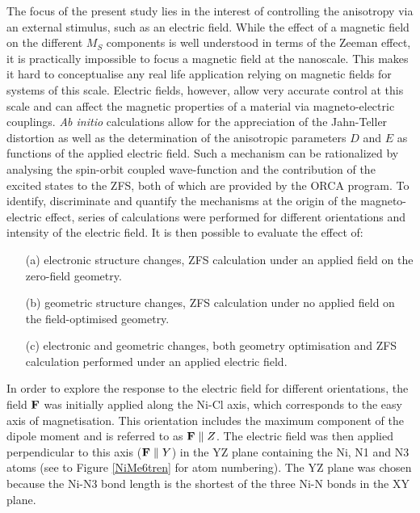 \documentclass[12pt]{report}
\numberwithin{equation}{section}
\begin{document}
\par The focus of the present study lies in the interest of controlling the anisotropy via an external stimulus, such as an electric field.
While the effect of a magnetic field on the different $M_S$ components is well understood in terms of the Zeeman effect, it is practically impossible to focus a magnetic field at the nanoscale.
This makes it hard to conceptualise any real life application relying on magnetic fields for systems of this scale.
Electric fields, however, allow very accurate control at this scale and can affect the magnetic properties of a material via magneto-electric couplings.
\textit{Ab initio} calculations allow for the appreciation of the Jahn-Teller distortion as well as the determination of the anisotropic parameters $D$ and $E$ as functions of the applied electric field.
Such a mechanism can be rationalized by analysing the spin-orbit coupled wave-function and the contribution of the excited states to the ZFS, both of which are provided by the ORCA program.
To identify, discriminate and quantify the mechanisms at the origin of the magneto-electric effect, series of calculations were performed for different orientations and intensity of the electric field.
It is then possible to evaluate the effect of:

\begin{itemize}
    \item[(a)] electronic structure changes, ZFS calculation under an applied field on the zero-field geometry.
    \item[(b)] geometric structure changes, ZFS calculation under no applied field on the field-optimised geometry.
    \item[(c)] electronic and geometric changes, both geometry optimisation and ZFS calculation performed under an applied electric field.
\end{itemize}

In order to explore the response to the electric field for different orientations, the field $\vb{F}$ was initially applied along the Ni-Cl axis, which corresponds to the easy axis of magnetisation.
This orientation includes the maximum component of the dipole moment and is referred to as $\vb{F}\parallel Z$.
The electric field was then applied perpendicular to this axis ($\vb{F}\parallel Y$) in the YZ plane containing the Ni, N1 and N3 atoms (see to Figure \ref{NiMe6tren} for atom numbering). 
The YZ plane was chosen because the Ni-N3 bond length is the shortest of the three Ni-N bonds in the XY plane.
\end{document}
